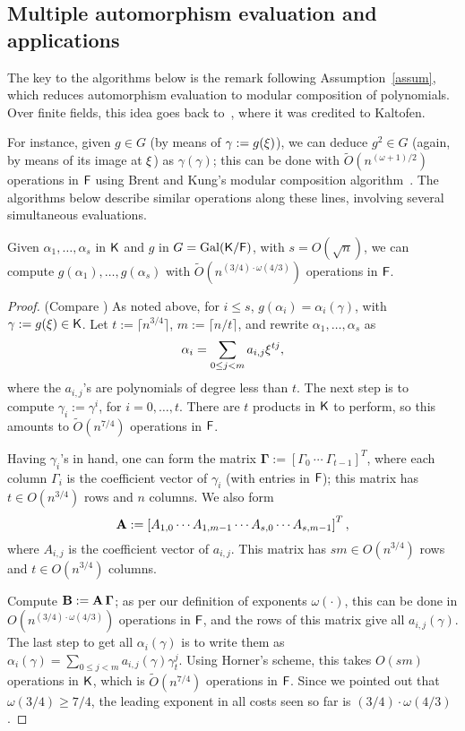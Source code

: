 
\subsection{Multiple automorphism evaluation and applications}

The key to the algorithms below is the remark following
Assumption~\ref{assum}, which reduces automorphism evaluation to
modular composition of polynomials.  Over finite fields, this idea goes back
to~\cite{GaSh92}, where it was credited to Kaltofen.

For instance, given $g \in G$ (by means of $\gamma:=g(\xi)$), we can
deduce $g^2 \in G$ (again, by means of its image at $\xi$) as
$\gamma(\gamma)$; this can be done with $\tilde{O}(n^{(\omega+1)/2})$
operations in ${\mathsf{F}}$ using Brent and Kung's modular composition
algorithm~\citep{BrKu78}. The algorithms below describe similar operations
along these lines, involving several simultaneous evaluations.

\begin{lemma}
  \label{lem:modcom}
  Given $\alpha_1,\dots,\alpha_s$ in ${\mathsf{K}}$ and $g$ in $G =
  \mathrm{Gal}({\mathsf{K}}/{\mathsf{F}})$, with $s = O(\sqrt{n})$, we can compute
  $g(\alpha_1),\dots,g(\alpha_s)$ with $\tilde
  O(n^{(3/4)\cdot\omega(4/3)})$ operations in ${\mathsf{F}}$.
\end{lemma}
\begin{proof}
(Compare \cite[Lemma~3]{KalSho98}) As noted above, for $i\le s$,
  $g(\alpha_i) = \alpha_i(\gamma)$, with $\gamma := g(\xi) \in {\mathsf{K}}$.
  Let $t := \lceil n^{3/4} \rceil$, $m:=\lceil n/t\rceil$, and rewrite $\alpha_1 , \ldots , \alpha_s$ as 
$$\alpha_i = \sum_{0 \leq j < m} a_{i,j}\xi^{tj},$$ where the
  $a_{i,j}$'s are polynomials of degree less than $t$. The next step
  is to compute $\gamma_i := \gamma^i$, for $i = 0 , \ldots , t$.
  There are $t$ products in ${\mathsf{K}}$ to perform, so this amounts to
  $\tilde{O}(n^{7/4})$ operations in ${\mathsf{F}}$.

  Having $\gamma_i$'s in hand, one can form the matrix
  $\boldsymbol{\Gamma} := \left[ \Gamma_0 ~ \cdots ~ \Gamma_{t-1}
    \right]^T$, where each column $\Gamma_i$ is the coefficient vector
  of $\gamma_i$ (with entries in ${\mathsf{F}}$); this matrix has $t \in
  O(n^{3/4})$ rows and $n$ columns. We also form
  $$\mat A := \left[{A}_{1,0} \cdots {A}_{1,m-1} \cdots
    {A}_{s,0} \cdots {A}_{s,m-1}\right]^T,$$ where
  ${A}_{i,j}$ is the coefficient vector of $a_{i,j}$. This matrix 
  has $s m \in O(n^{3/4})$ rows and $t \in O(n^{3/4})$ columns.

  Compute $\mat B:=\mat A\, \boldsymbol{\Gamma}$; as per our
  definition of exponents $\omega(\cdot )$, this can be done in
  $O(n^{(3/4)\cdot \omega(4/3)})$ operations in ${\mathsf{F}}$, and the rows of this matrix
  give all $a_{i,j}(\gamma)$.  The last step to get all
  $\alpha_i(\gamma)$ is to write them as $\alpha_i(\gamma) = \sum_{0
    \leq j < m} a_{i,j}(\gamma) \gamma_t^{j}.$ Using Horner's scheme,
  this takes $O(sm)$ operations in ${\mathsf{K}}$, which is $\tilde{O}(n^{7/4})$
  operations in ${\mathsf{F}}$. Since we pointed out that $\omega(3/4) \ge 7/4$,
  the leading exponent in all costs seen so far is
  $(3/4)\cdot\omega(4/3)$.
\end{proof}


